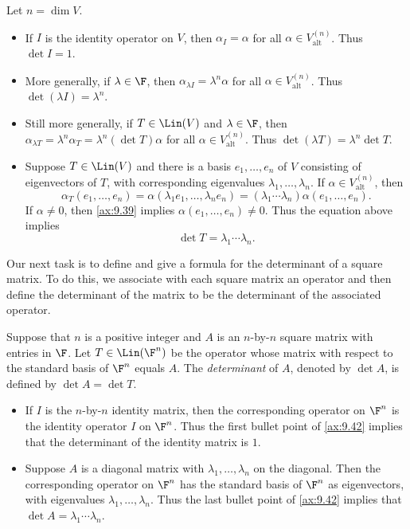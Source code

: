 \begin{example}\label{ax:9.42}
Let $n=\dim V$.
\begin{itemize}
\item If $I$ is the identity operator on $V$, then $\alpha_I=\alpha$ for all
  $\alpha\in V_{\mathrm{alt}}^{(n)}$. Thus $\det I=1$.
\item More generally, if $\lambda\in\F$, then $\alpha_{\lambda I}=\lambda^n\alpha$
  for all $\alpha\in V_{\mathrm{alt}}^{(n)}$. Thus $\det(\lambda I)=\lambda^n$.
\item Still more generally, if $T\in\Lin(V)$ and $\lambda\in\F$, then
  $\alpha_{\lambda T}=\lambda^n\alpha_T=\lambda^n(\det T)\alpha$ for all
  $\alpha\in V_{\mathrm{alt}}^{(n)}$. Thus $\det(\lambda T)=\lambda^n\det T$.
\item Suppose $T\in\Lin(V)$ and there is a basis $e_1,\dots,e_n$ of $V$
  consisting of eigenvectors of $T$, with corresponding eigenvalues
  $\lambda_1,\dots,\lambda_n$. If $\alpha\in V_{\mathrm{alt}}^{(n)}$, then
  \[ \alpha_T(e_1,\dots,e_n) = \alpha(\lambda_1e_1,\dots,\lambda_ne_n)
     = (\lambda_1\cdots\lambda_n)\alpha(e_1,\dots,e_n). \]
  If $\alpha\ne0$, then \ref{ax:9.39} implies $\alpha(e_1,\dots,e_n)\ne0$.
  Thus the equation above implies
  \[ \det T = \lambda_1\cdots\lambda_n. \]
\end{itemize}
\end{example}

Our next task is to define and give a formula for the determinant of a square
matrix. To do this, we associate with each square matrix an operator and then
define the determinant of the matrix to be the determinant of the associated
operator.

\begin{definition}\label{ax:9.43}
Suppose that $n$ is a positive integer and $A$ is an $n$-by-$n$ square matrix
with entries in $\F$. Let $T\in\Lin(\F^n)$ be the operator whose matrix with
respect to the standard basis of $\F^n$ equals $A$. The \emph{determinant} of
$A$, denoted by $\det A$, is defined by $\det A=\det T$.
\end{definition}

\begin{example}\label{ax:9.44}\leavevmode
\begin{itemize}
\item If $I$ is the $n$-by-$n$ identity matrix, then the corresponding operator
  on $\F^n$ is the identity operator $I$ on $\F^n$. Thus the first bullet point
  of \ref{ax:9.42} implies that the determinant of the identity matrix is $1$.
\item Suppose $A$ is a diagonal matrix with $\lambda_1,\dots,\lambda_n$ on the
  diagonal. Then the corresponding operator on $\F^n$ has the standard basis
  of $\F^n$ as eigenvectors, with eigenvalues $\lambda_1,\dots,\lambda_n$. Thus
  the last bullet point of \ref{ax:9.42} implies that
  $\det A=\lambda_1\cdots\lambda_n$.
\end{itemize}
\end{example}

